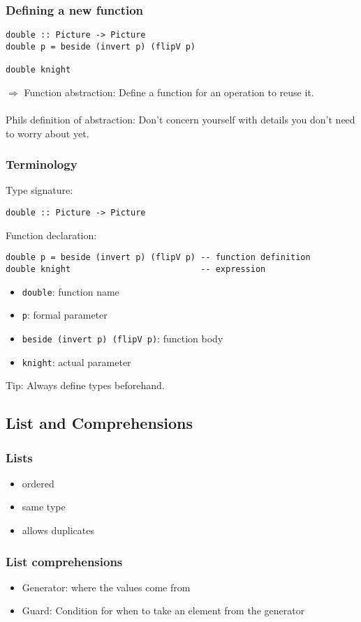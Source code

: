 \documentclass{article}
\begin{document}
\subsubsection{Defining a new function}
\begin{verbatim}
double :: Picture -> Picture
double p = beside (invert p) (flipV p)

double knight
\end{verbatim}
$\Rightarrow$ Function abstraction: Define a function for an operation to reuse it.\\\\
Phils definition of abstraction: Don't concern yourself with details you don't need to worry about yet.
\subsubsection{Terminology}
Type signature:
\begin{verbatim}
double :: Picture -> Picture
\end{verbatim}
Function declaration:
\begin{verbatim}
double p = beside (invert p) (flipV p) -- function definition
double knight                          -- expression
\end{verbatim}
\begin{itemize}
	\item \texttt{double}: function name
	\item \texttt{p}: formal parameter
	\item \texttt{beside (invert p) (flipV p)}: function body
	\item \texttt{knight}: actual parameter
\end{itemize}
Tip: Always define types beforehand.
\subsection{List and Comprehensions}
\subsubsection{Lists}
\begin{itemize}
	\item ordered
	\item same type
	\item allows duplicates
\end{itemize}
\subsubsection{List comprehensions}
\begin{itemize}
	\item Generator: where the values come from
	\item Guard: Condition for when to take an element from the generator
\end{itemize}
\end{document}
